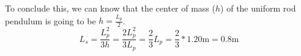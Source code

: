 \documentclass[12pt]{article}
\begin{document}
To conclude this, we can know that the center of mass ($h$) of the uniform rod pendulum is going to be \(h = \frac{L_p}{2}\).
\begin{equation}
    L_s =   \frac{L_p^2}{3h}
        =   \frac{2L_p^2}{3L_p}
        =   \frac{2}{3}L_p
        =   \frac{2}{3}*1.20\unit{\meter}
        =   \boxed{0.8\unit{\meter}}
\end{equation}
\end{document}
